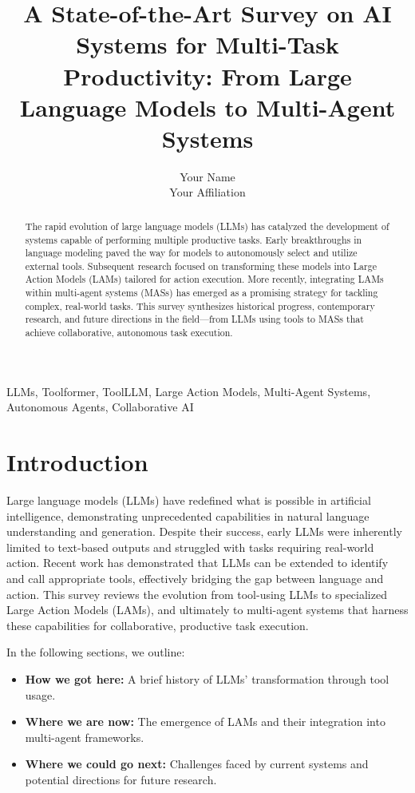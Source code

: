 \documentclass[journal,twoside,10pt]{IEEEtran}
\begin{document}
\title{A State-of-the-Art Survey on AI Systems for Multi-Task Productivity: From Large Language Models to Multi-Agent Systems}

\author{Your Name \\ Your Affiliation}

\maketitle

\begin{abstract}
The rapid evolution of large language models (LLMs) has catalyzed the development of systems capable of performing multiple productive tasks. Early breakthroughs in language modeling paved the way for models to autonomously select and utilize external tools. Subsequent research focused on transforming these models into Large Action Models (LAMs) tailored for action execution. More recently, integrating LAMs within multi-agent systems (MASs) has emerged as a promising strategy for tackling complex, real-world tasks. This survey synthesizes historical progress, contemporary research, and future directions in the field—from LLMs using tools to MASs that achieve collaborative, autonomous task execution.
\end{abstract}

\begin{IEEEkeywords}
LLMs, Toolformer, ToolLLM, Large Action Models, Multi-Agent Systems, Autonomous Agents, Collaborative AI
\end{IEEEkeywords}

\section{Introduction}
Large language models (LLMs) have redefined what is possible in artificial intelligence, demonstrating unprecedented capabilities in natural language understanding and generation. Despite their success, early LLMs were inherently limited to text-based outputs and struggled with tasks requiring real-world action. Recent work has demonstrated that LLMs can be extended to identify and call appropriate tools, effectively bridging the gap between language and action. This survey reviews the evolution from tool-using LLMs to specialized Large Action Models (LAMs), and ultimately to multi-agent systems that harness these capabilities for collaborative, productive task execution.

In the following sections, we outline:
\begin{itemize}
    \item \textbf{How we got here:} A brief history of LLMs' transformation through tool usage.
    \item \textbf{Where we are now:} The emergence of LAMs and their integration into multi-agent frameworks.
    \item \textbf{Where we could go next:} Challenges faced by current systems and potential directions for future research.
\end{itemize}
\end{document}
